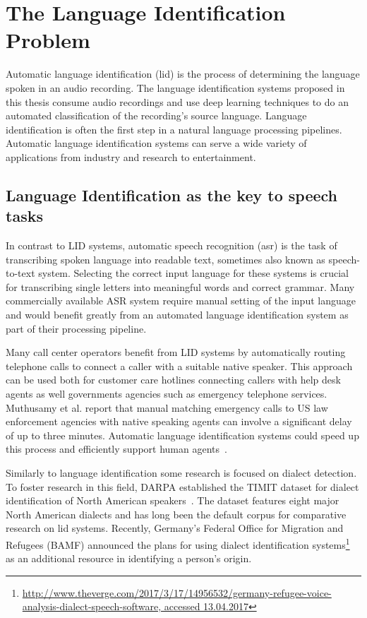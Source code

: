\section{The Language Identification Problem}
\label{sec:lid}

Automatic language identification (\ac{lid}) is the process of determining the language spoken in an audio recording. The language identification systems proposed in this thesis consume audio recordings and use deep learning techniques to do an automated classification of the recording's source language.
Language identification is often the first step in a natural language processing pipelines. Automatic language identification systems can serve a wide variety of applications from industry and research to entertainment. 

\subsection{Language Identification as the key to speech tasks}
In contrast to LID systems, automatic speech recognition (\ac{asr}) is the task of transcribing spoken language into readable text, sometimes also known as speech-to-text system. Selecting the correct input language for these systems is crucial for transcribing single letters into meaningful words and correct grammar. Many commercially available ASR system require manual setting of the input language and would benefit greatly from an automated language identification system as part of their processing pipeline.

Many call center operators benefit from LID systems by automatically routing telephone calls to connect a caller with a suitable native speaker. This approach can be used both for customer care hotlines connecting callers with help desk agents as well governments agencies such as emergency telephone services. Muthusamy et al. report that manual matching emergency calls to US law enforcement agencies with native speaking agents can involve a significant delay of up to three minutes. Automatic language identification systems could speed up this process and efficiently support human agents~\cite{muthusamy1994reviewing}.

Similarly to language identification some research is focused on dialect detection. To foster research in this field, DARPA established the TIMIT dataset for dialect identification of North American speakers~\cite{garofolo1993darpa}. The dataset features eight major North American dialects and has long been the default corpus for comparative research on lid systems.
Recently, Germany's Federal Office for Migration and Refugees (BAMF) announced the plans for using dialect identification systems\footnote{\url{http://www.theverge.com/2017/3/17/14956532/germany-refugee-voice-analysis-dialect-speech-software, accessed 13.04.2017}} as an additional resource in identifying a person's origin.


